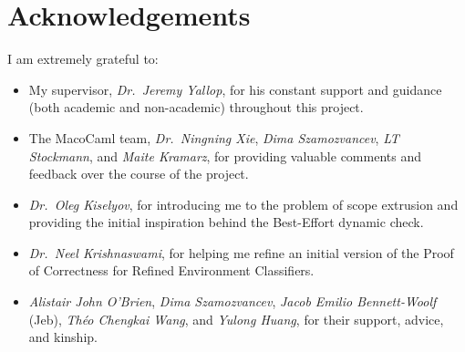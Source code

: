 \chapter*{Acknowledgements}

I am extremely grateful to:
\begin{itemize}
  \item My supervisor, \textit{Dr.\ Jeremy Yallop}, for his constant support and guidance (both academic and non-academic) throughout this project. 
  \item The MacoCaml team, \textit{Dr.\ Ningning Xie}, \textit{Dima Szamozvancev}, \textit{LT Stockmann}, and \textit{Maite Kramarz}, for providing valuable comments and feedback over the course of the project. 
  \item \textit{Dr.\ Oleg Kiselyov}, for introducing me to the problem of scope extrusion and providing the initial inspiration behind the Best-Effort dynamic check. 
  \item \textit{Dr.\ Neel Krishnaswami}, for helping me refine an initial version of the Proof of Correctness for Refined Environment Classifiers. 
  \item  \textit{Alistair John O'Brien}, \textit{Dima Szamozvancev}, \textit{Jacob Emilio Bennett-Woolf} (Jeb), \textit{Théo Chengkai Wang}, and \textit{Yulong Huang}, for their support, advice, and kinship.

\end{itemize}